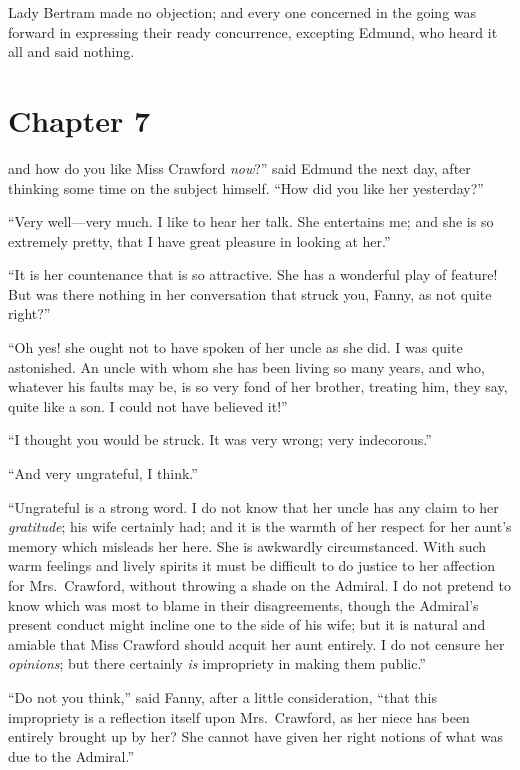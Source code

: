 Lady Bertram made no objection; and every one concerned in
the going was forward in expressing their ready concurrence,
excepting Edmund, who heard it all and said nothing.



\chapter{Chapter 7}

 and how do you like Miss Crawford \emph{now}?''
said Edmund the next day, after thinking some time on the
subject himself.  ``How did you like her yesterday?''

``Very well---very much.  I like to hear her talk.
She entertains me; and she is so extremely pretty, that I
have great pleasure in looking at her.''

``It is her countenance that is so attractive.  She has
a wonderful play of feature!  But was there nothing in her
conversation that struck you, Fanny, as not quite right?''

``Oh yes! she ought not to have spoken of her uncle as she did.
I was quite astonished.  An uncle with whom she has been
living so many years, and who, whatever his faults may be,
is so very fond of her brother, treating him, they say,
quite like a son.  I could not have believed it!''

``I thought you would be struck.  It was very wrong;
very indecorous.''

``And very ungrateful, I think.''

``Ungrateful is a strong word.  I do not know that her uncle
has any claim to her \emph{gratitude}; his wife certainly had;
and it is the warmth of her respect for her aunt's memory
which misleads her here.  She is awkwardly circumstanced.
With such warm feelings and lively spirits it must be
difficult to do justice to her affection for Mrs.\ Crawford,
without throwing a shade on the Admiral.  I do not pretend
to know which was most to blame in their disagreements,
though the Admiral's present conduct might incline one
to the side of his wife; but it is natural and amiable
that Miss Crawford should acquit her aunt entirely.
I do not censure her \emph{opinions}; but there certainly \emph{is}
impropriety in making them public.''

``Do not you think,'' said Fanny, after a little consideration,
``that this impropriety is a reflection itself upon
Mrs.\ Crawford, as her niece has been entirely brought
up by her?  She cannot have given her right notions
of what was due to the Admiral.''

